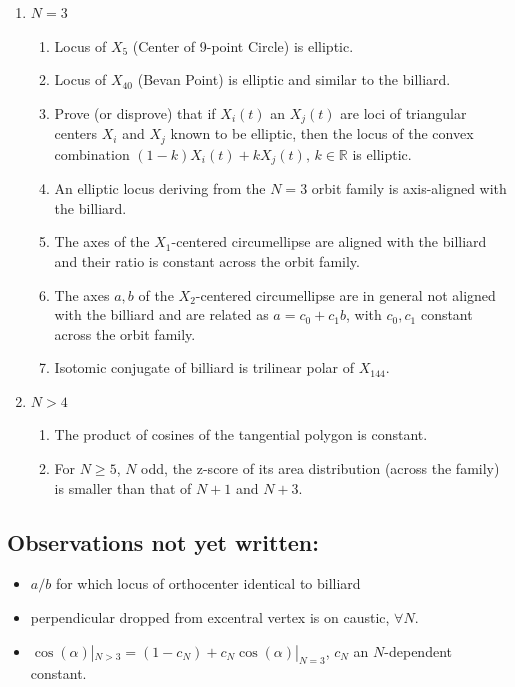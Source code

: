 \documentclass[]{article}
\providecommand{\tightlist}{%
  \setlength{\itemsep}{0pt}\setlength{\parskip}{0pt}}
\begin{document}
\begin{enumerate}
\def\labelenumi{\arabic{enumi}.}
\tightlist
\item
  \(N=3\)

  \begin{enumerate}
  \def\labelenumii{\arabic{enumii}.}
  \tightlist
  \item
    Locus of \(X_5\) (Center of 9-point Circle) is elliptic.
  \item
    Locus of \(X_{40}\) (Bevan Point) is elliptic and similar to the billiard.
  \item
    Prove (or disprove) that if \(X_i(t)\) an \(X_j(t)\) are loci of triangular centers \(X_i\) and \(X_j\) known to be elliptic, then the locus of the convex combination \((1-k) X_i(t)+k X_j(t),\,k\in\mathbb{R}\) is elliptic.
  \item
    An elliptic locus deriving from the \(N=3\) orbit family is axis-aligned with the billiard.
  \item
    The axes of the \(X_1\)-centered circumellipse are aligned with the billiard and their ratio is constant across the orbit family.
  \item
    The axes \(a,b\) of the \(X_2\)-centered circumellipse are in general not aligned with the billiard and are related as \(a=c_0 + c_1 b\), with \(c_0,c_1\) constant across the orbit family.
  \item
    Isotomic conjugate of billiard is trilinear polar of \(X_{144}\).
  \end{enumerate}
\item
  \(N>4\)

  \begin{enumerate}
  \def\labelenumii{\arabic{enumii}.}
  \tightlist
  \item
    The product of cosines of the tangential polygon is constant.
  \item
    For \(N\geq5\), \(N\) odd, the z-score of its area distribution (across the family) is smaller than that of \(N+1\) and \(N+3\).
  \end{enumerate}
\end{enumerate}

\hypertarget{observations-not-yet-written}{%
\subsection{Observations not yet written:}\label{observations-not-yet-written}}

\begin{itemize}
\tightlist
\item
  \(a/b\) for which locus of orthocenter identical to billiard
\item
  perpendicular dropped from excentral vertex is on caustic, \(\forall N\).
\item
  \(\cos(\alpha)|_{N>3} = (1-c_N)+c_N\cos(\alpha)|_{N=3}\), \(c_N\) an \(N\)-dependent constant.
\end{itemize}
\end{document}
